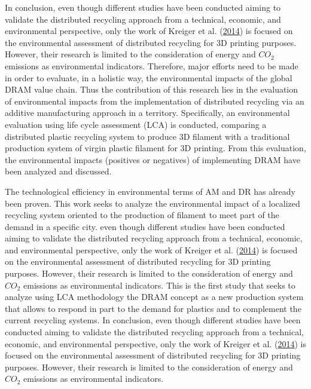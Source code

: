 \documentclass[12pt]{elsarticle} %
\begin{document}
In conclusion, even though different studies have been conducted aiming to validate the distributed recycling approach from a technical, economic, and environmental perspective, only the work of Kreiger et al. (\protect\hyperlink{ref-Kreiger2014}{2014}) is focused on the environmental assessment of distributed recycling for 3D printing purposes.
However, their research is limited to the consideration of energy and \(CO_{2}\) emissions as environmental indicators. Therefore, major efforts need to be made in order to evaluate, in a holistic way, the environmental impacts of the global DRAM value chain.
Thus the contribution of this research lies in the evaluation of environmental impacts from the implementation of distributed recycling via an additive manufacturing approach in a territory. Specifically, an environmental evaluation using life cycle assessment (LCA) is conducted, comparing a distributed plastic recycling system to produce 3D filament with a traditional production system of virgin plastic filament for 3D printing. From this evaluation, the environmental impacts (positives or negatives) of implementing DRAM have been analyzed and discussed.

The technological efficiency in environmental terms of AM and DR has already been proven.
This work seeks to analyze the environmental impact of a localized recycling system oriented to the production of filament to meet part of the demand in a specific city. even though different studies have been conducted aiming to validate the distributed recycling approach from a technical, economic, and environmental perspective, only the work of Kreiger et al. (\protect\hyperlink{ref-Kreiger2014}{2014}) is focused on the environmental assessment of distributed recycling for 3D printing purposes. However, their research is limited to the consideration of energy and \(CO_{2}\) emissions as environmental indicators.
This is the first study that seeks to analyze using LCA methodology the DRAM concept as a new production system that allows to respond in part to the demand for plastics and to complement the current recycling systems.
In conclusion, even though different studies have been conducted aiming to validate the distributed recycling approach from a technical, economic, and environmental perspective, only the work of Kreiger et al. (\protect\hyperlink{ref-Kreiger2014}{2014}) is focused on the environmental assessment of distributed recycling for 3D printing purposes. However, their research is limited to the consideration of energy and \(CO_{2}\) emissions as environmental indicators.
\end{document}
